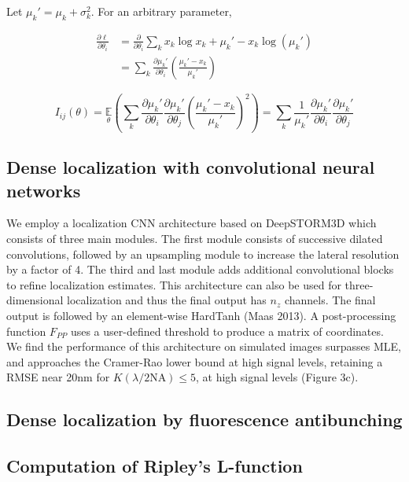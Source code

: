 \documentclass{ucetd}
\begin{document}
Let $\mu_{k}' = \mu_{k} + \sigma_{k}^{2}$. For an arbitrary parameter,

\begin{align*}
\frac{\partial \ell}{\partial \theta_{i}} &= \frac{\partial}{\partial \theta_{i}} \sum_{k}  x_{k}\log x_{k} + \mu_{k}' - x_{k}\log\left(\mu_{k}'\right)\\
&= \sum_{k} \frac{\partial \mu_{k}'}{\partial\theta_{i}} \left(\frac{\mu_{k}'-x_{k}}{\mu_{k}'}\right)
\end{align*}

\begin{equation*}
I_{ij}(\theta) = \underset{\theta}{\mathbb{E}}\left(\sum_{k}\frac{\partial \mu_{k}'}{\partial\theta_{i}}\frac{\partial \mu_{k}'}{\partial\theta_{j}} \left(\frac{\mu_{k}'-x_{k}}{\mu_{k}'}\right)^{2}\right) = \sum_{k}\frac{1}{\mu_{k}'}\frac{\partial \mu_{k}'}{\partial\theta_{i}}\frac{\partial \mu_{k}'}{\partial\theta_{j}}
\end{equation*}

\subsection{Dense localization with convolutional neural networks}

We employ a localization CNN architecture based on DeepSTORM3D which consists of three main modules. The first module consists of successive dilated convolutions, followed by an upsampling module to increase the lateral resolution by a factor of 4. The third and last module adds additional convolutional blocks to refine localization estimates. This architecture can also be used for three-dimensional localization and thus the final output has $n_{z}$ channels. The final output is followed by an element-wise HardTanh (Maas 2013). A post-processing function $F_{PP}$ uses a user-defined threshold to produce a matrix of coordinates. We find the performance of this architecture on simulated images surpasses MLE, and approaches the Cramer-Rao lower bound at high signal levels, retaining a RMSE near 20nm for $K(\lambda/2\mathrm{NA}) \leq 5$, at high signal levels (Figure 3c). 

\subsection{Dense localization by fluorescence antibunching}

\subsection{Computation of Ripley's L-function}
\end{document}
